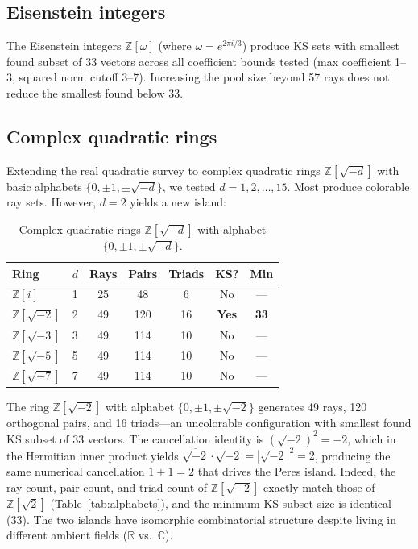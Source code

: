 \documentclass[12pt,a4paper]{article}
\newcommand{\R}{\mathbb{R}}
\newcommand{\C}{\mathbb{C}}
\newcommand{\Z}{\mathbb{Z}}
\begin{document}
\subsection{Eisenstein integers}

The Eisenstein integers $\Z[\omega]$ (where $\omega = e^{2\pi i/3}$) produce KS sets with smallest found subset of 33 vectors across all coefficient bounds tested (max coefficient 1--3, squared norm cutoff 3--7). Increasing the pool size beyond 57 rays does not reduce the smallest found below 33.

\subsection{Complex quadratic rings}\label{sec:complex-quadratic}

Extending the real quadratic survey to complex quadratic rings $\Z[\sqrt{-d}]$ with basic alphabets $\{0, \pm 1, \pm\sqrt{-d}\}$, we tested $d = 1, 2, \ldots, 15$. Most produce colorable ray sets. However, $d = 2$ yields a new island:

\begin{table}[ht]
\centering
\caption{Complex quadratic rings $\Z[\sqrt{-d}]$ with alphabet $\{0, \pm 1, \pm\sqrt{-d}\}$.}
\label{tab:complex-quadratic}
\begin{tabular}{lcccccc}
\toprule
Ring & $d$ & Rays & Pairs & Triads & KS? & Min \\
\midrule
$\Z[i]$ & 1 & 25 & 48 & 6 & No & --- \\
$\Z[\sqrt{-2}]$ & 2 & 49 & 120 & 16 & \textbf{Yes} & \textbf{33} \\
$\Z[\sqrt{-3}]$ & 3 & 49 & 114 & 10 & No & --- \\
$\Z[\sqrt{-5}]$ & 5 & 49 & 114 & 10 & No & --- \\
$\Z[\sqrt{-7}]$ & 7 & 49 & 114 & 10 & No & --- \\
\bottomrule
\end{tabular}
\end{table}

The ring $\Z[\sqrt{-2}]$ with alphabet $\{0, \pm 1, \pm\sqrt{-2}\}$ generates 49 rays, 120 orthogonal pairs, and 16 triads---an uncolorable configuration with smallest found KS subset of 33 vectors. The cancellation identity is $(\sqrt{-2})^2 = -2$, which in the Hermitian inner product yields $\overline{\sqrt{-2}} \cdot \sqrt{-2} = |\sqrt{-2}|^2 = 2$, producing the same numerical cancellation $1 + 1 = 2$ that drives the Peres island. Indeed, the ray count, pair count, and triad count of $\Z[\sqrt{-2}]$ exactly match those of $\Z[\sqrt{2}]$ (Table~\ref{tab:alphabets}), and the minimum KS subset size is identical (33). The two islands have isomorphic combinatorial structure despite living in different ambient fields ($\R$ vs.\ $\C$).
\end{document}
